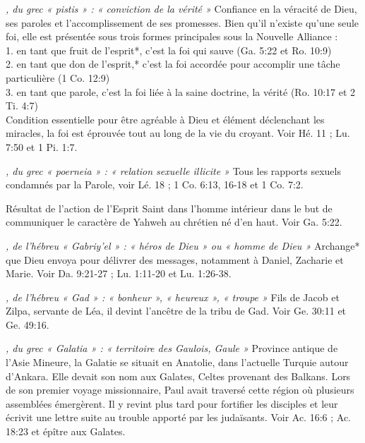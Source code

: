 \begin{multicols}{2}
{\textit{, du grec « pistis » : « conviction de la vérité »}\newline
Confiance en la véracité de Dieu, ses paroles et l'accomplissement de ses promesses. Bien qu'il n'existe qu'une seule foi, elle est présentée sous trois formes principales sous la Nouvelle Alliance :
\\1. en tant que fruit de l'esprit*, c'est la foi qui sauve (Ga. 5:22 et Ro. 10:9)
\\2. en tant que don de l'esprit,* c'est la foi accordée pour accomplir une tâche particulière (1 Co. 12:9)
\\3. en tant que parole, c'est la foi liée à la saine doctrine, la vérité (Ro. 10:17 et 2 Ti. 4:7)
\\Condition essentielle pour être agréable à Dieu et élément déclenchant les miracles, la foi est éprouvée tout au long de la vie du croyant. Voir Hé. 11 ; Lu. 7:50 et 1 Pi. 1:7.

\textit{, du grec « poerneia » : « relation sexuelle illicite »}\newline
Tous les rapports sexuels condamnés par la Parole, voir Lé. 18 ; 1 Co. 6:13, 16-18 et 1 Co. 7:2.

\textit{}\newline
Résultat de l'action de l'Esprit Saint dans l'homme intérieur dans le but de communiquer le caractère de Yahweh au chrétien né d'en haut. Voir Ga. 5:22.

\textit{, de l'hébreu « Gabriy'el » : « héros de Dieu » ou « homme de Dieu »}\newline
Archange* que Dieu envoya pour délivrer des messages, notamment à Daniel, Zacharie et Marie. Voir Da. 9:21-27 ; Lu. 1:11-20 et Lu. 1:26-38.

\textit{, de l'hébreu « Gad » : « bonheur », « heureux », « troupe »}\newline
Fils de Jacob et Zilpa, servante de Léa, il devint l'ancêtre de la tribu de Gad. Voir Ge. 30:11 et Ge. 49:16.

\textit{, du grec « Galatia » : « territoire des Gaulois, Gaule »}\newline
Province antique de l'Asie Mineure, la Galatie se situait en Anatolie, dans l'actuelle Turquie autour d'Ankara. Elle devait son nom aux Galates, Celtes provenant des Balkans. Lors de son premier voyage missionnaire, Paul avait traversé cette région où plusieurs assemblées émergèrent. Il y revint plus tard pour fortifier les disciples et leur écrivit une lettre suite au trouble apporté par les judaïsants. Voir Ac. 16:6 ; Ac. 18:23 et épître aux Galates.

}
\end{multicols}

